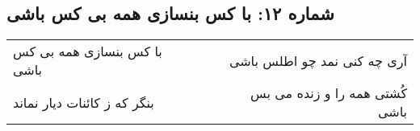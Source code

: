 \begin{center}
\section*{شماره ۱۲: با کس بنسازی همه بی کس باشی}
\label{sec:012}
\begin{longtable}{l p{0.5cm} r}
با کس بنسازی همه بی کس باشی
&&
آری چه کنی نمد چو اطلس باشی
\\
بنگر که ز کائنات دیار نماند
&&
کُشتی همه را و زنده می بس باشی
\\
\end{longtable}
\end{center}
